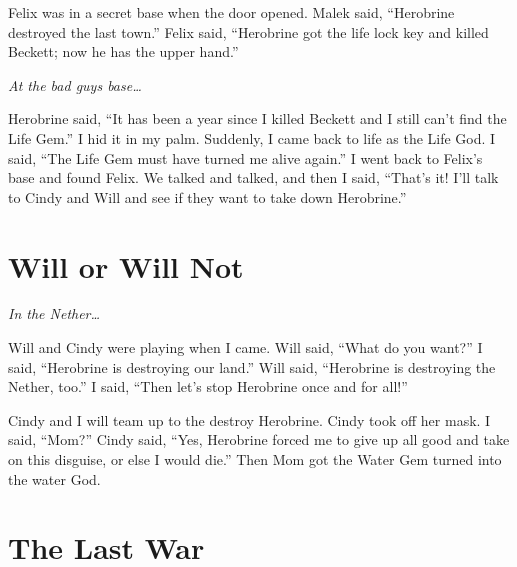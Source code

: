 \documentclass[12pt,twoside]{krantz}
\begin{document}
Felix was in a secret base when the door opened. Malek said, ``Herobrine
destroyed the last town.'' Felix said, ``Herobrine got the life lock key
and killed Beckett; now he has the upper hand.''

\emph{At the bad guys base\ldots{}}

Herobrine said, ``It has been a year since I killed Beckett and I still
can't find the Life Gem.'' I hid it in my palm. Suddenly, I came back to
life as the Life God. I said, ``The Life Gem must have turned me alive
again.'' I went back to Felix's base and found Felix. We talked and
talked, and then I said, ``That's it! I'll talk to Cindy and Will and
see if they want to take down Herobrine.''

\hypertarget{will-or-will-not}{%
\section{Will or Will Not}\label{will-or-will-not}}

\emph{In the Nether\ldots{}}

Will and Cindy were playing when I came. Will said, ``What do you
want?'' I said, ``Herobrine is destroying our land.'' Will said,
``Herobrine is destroying the Nether, too.'' I said, ``Then let's stop
Herobrine once and for all!''

Cindy and I will team up to the destroy Herobrine. Cindy took off her
mask. I said, ``Mom?'' Cindy said, ``Yes, Herobrine forced me to give up
all good and take on this disguise, or else I would die.'' Then Mom got
the Water Gem turned into the water God.

\hypertarget{the-last-war}{%
\section{The Last War}\label{the-last-war}}
\end{document}
